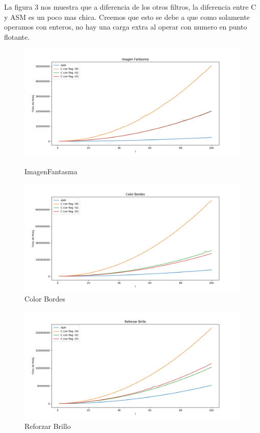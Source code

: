 \documentclass[a4paper]{article}
\begin{document}
La figura 3 nos muestra que a diferencia de los otros filtros, la diferencia entre C y ASM es un poco mas chica. Creemos que esto se debe a que como solamente operamos con enteros, no hay una carga extra al operar con numero en punto flotante.


\begin{figure}[h!]			
			\includegraphics[width=\linewidth]{img/imagenFantasma.png}
			\caption{ImagenFantasma}
			\includegraphics[width=\linewidth]{img/colorBordes.png}
			\caption{Color Bordes}
\end{figure}


\begin{figure}[h!]			
	\includegraphics[width=\linewidth]{img/reforzarBrillo.png}
	\caption{Reforzar Brillo}
\end{figure}
\end{document}
